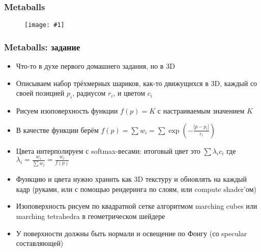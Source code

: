 \documentclass{beamer}
\newcommand{\slideimage}[1]{
  \begin{figure}
    \begin{adjustbox}{width=\textwidth, totalheight=\textheight-2\baselineskip-2\baselineskip,keepaspectratio}
      \texttt{[image: \#1]}
    \end{adjustbox}
  \end{figure}
}
\begin{document}
\begin{frame}
\frametitle{Metaballs}
\slideimage{metaballs.jpg}
\end{frame}

\begin{frame}[fragile]
\frametitle{Metaballs: задание}
\fontsize{8pt}{8pt}
\selectfont
\begin{itemize}
\item Что-то в духе первого домашнего задания, но в 3D
\item Описываем набор трёхмерных шариков, как-то движущихся в 3D, каждый со своей позицией \begin{math}p_i\end{math}, радиусом \begin{math}r_i\end{math}, и цветом \begin{math}c_i\end{math}
\item Рисуем изоповерхность функции \begin{math}f(p) = K\end{math} с настраиваемым значением \begin{math}K\end{math}
\item В качестве функции берём \begin{math}f(p) = \sum w_i = \sum \exp\left(-\frac{|p-p_i|}{r_i}\right)\end{math}
\item Цвета интерполируем с softmax-весами: итоговый цвет это \begin{math}\sum \lambda_i c_i\end{math} где \begin{math}\lambda_i = \frac{w_i}{\sum w_j} = \frac{w_i}{f(p)}\end{math}
\item Функцию и цвета нужно хранить как 3D текстуру и обновлять на каждый кадр (руками, или с помощью рендеринга по слоям, или compute shader'ом)
\item Изоповерхность рисуем по квадратной сетке алгоритмом marching cubes или marching tetrahedra в геометрическом шейдере
\item У поверхности должны быть нормали и освещение по Фонгу (со specular составляющей)
\end{itemize}
\end{frame}
\end{document}
